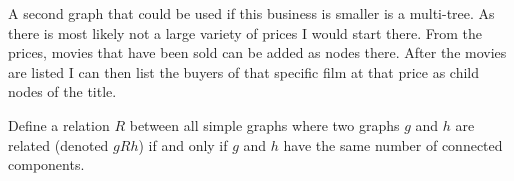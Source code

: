 \documentclass{article}
\begin{document}
A second graph that could be used if this business is smaller is a multi-tree. As there is most likely not a large variety of prices I would start there.
From the prices, movies that have been sold can be added as nodes there. After the movies are listed I can then list the buyers of that specific film at that price as child nodes of the title.

 

Define a relation $R$ between all simple graphs where two graphs $g$ and $h$ are
related (denoted $gRh$) if and only if $g$ and $h$ have the same number of
connected components.
\end{document}
